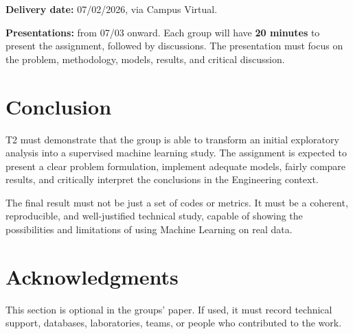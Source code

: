 \documentclass[a4paper]{ifacconf}
\begin{document}
\textbf{Delivery date:} 07/02/2026, via Campus Virtual.

\textbf{Presentations:} from 07/03 onward. Each group will have \textbf{20 minutes} to present the assignment, followed by discussions. The presentation must focus on the problem, methodology, models, results, and critical discussion.

\section{Conclusion}

T2 must demonstrate that the group is able to transform an initial exploratory analysis into a supervised machine learning study. The assignment is expected to present a clear problem formulation, implement adequate models, fairly compare results, and critically interpret the conclusions in the Engineering context.

The final result must not be just a set of codes or metrics. It must be a coherent, reproducible, and well-justified technical study, capable of showing the possibilities and limitations of using Machine Learning on real data.

\section*{Acknowledgments}

This section is optional in the groups' paper. If used, it must record technical support, databases, laboratories, teams, or people who contributed to the work.

\nocite{grus2020,muller2016,geron2020,nielsen2021,pedregosa2011,lacerda2020}

\end{document}
